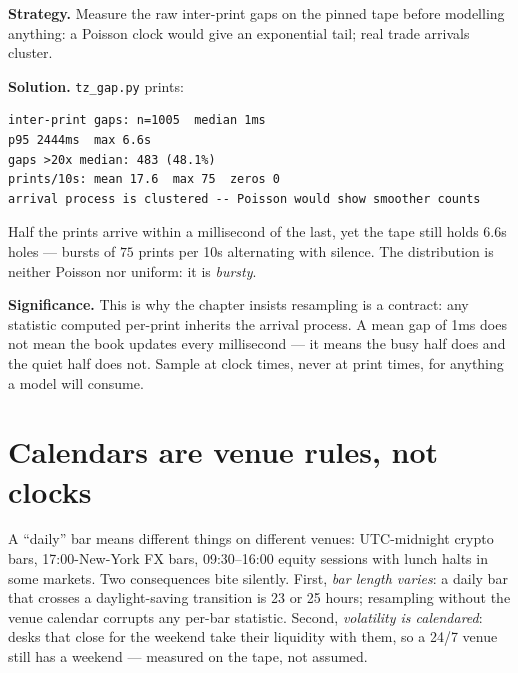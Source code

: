\begin{example}\label{ex:cluster}
\textbf{Strategy.} Measure the raw inter-print gaps on the pinned
tape before modelling anything: a Poisson clock would give an
exponential tail; real trade arrivals cluster.

\textbf{Solution.} \texttt{tz\_gap.py} prints:
\begin{verbatim}
inter-print gaps: n=1005  median 1ms
p95 2444ms  max 6.6s
gaps >20x median: 483 (48.1%)
prints/10s: mean 17.6  max 75  zeros 0
arrival process is clustered -- Poisson would show smoother counts
\end{verbatim}
Half the prints arrive within a millisecond of the last, yet the
tape still holds $6.6$s holes --- bursts of $75$ prints per 10s
alternating with silence. The distribution is neither Poisson nor
uniform: it is \emph{bursty}.

\textbf{Significance.} This is why the chapter insists resampling
is a contract: any statistic computed per-print inherits the
arrival process. A mean gap of 1ms does not mean the book updates
every millisecond --- it means the busy half does and the quiet
half does not. Sample at clock times, never at print times, for
anything a model will consume.
\end{example}

\section{Calendars are venue rules, not clocks}\label{sec:calendars}
A ``daily'' bar means different things on different venues:
UTC-midnight crypto bars, 17:00-New-York FX bars, 09:30--16:00
equity sessions with lunch halts in some markets. Two consequences
bite silently. First, \emph{bar length varies}: a daily bar that
crosses a daylight-saving transition is 23 or 25 hours; resampling
without the venue calendar corrupts any per-bar statistic. Second,
\emph{volatility is calendared}: desks that close for the weekend
take their liquidity with them, so a 24/7 venue still has a
weekend --- measured on the tape, not assumed.

